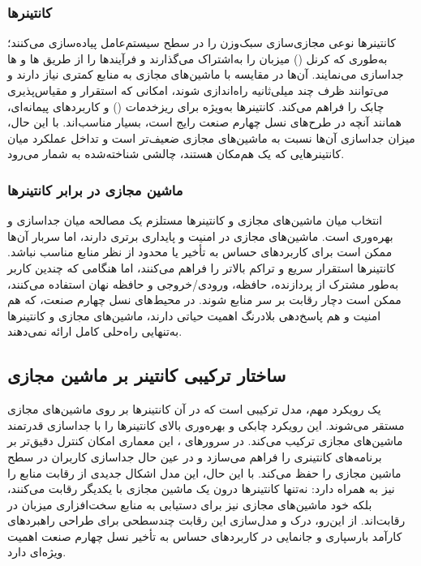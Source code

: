 \subsubsection{کانتینر‌ها}

کانتینرها نوعی مجازی‌سازی سبک‌وزن را در سطح سیستم‌عامل پیاده‌سازی می‌کنند؛ به‌طوری که کرنل () میزبان را به‌اشتراک می‌گذارند و فرآیندها را از طریق ها و ها جداسازی می‌نمایند. آن‌ها در مقایسه با ماشین‌های مجازی به منابع کمتری نیاز دارند و می‌توانند ظرف چند میلی‌ثانیه راه‌اندازی شوند، امکانی که استقرار و مقیاس‌پذیری چابک را فراهم می‌کند. کانتینرها به‌ویژه برای ریزخدمات () و کاربردهای پیمانه‌ای، همانند آنچه در طرح‌های نسل چهارم صنعت رایج است، بسیار مناسب‌اند. با این حال، میزان جداسازی آن‌ها نسبت به ماشین‌های مجازی ضعیف‌تر است و تداخل عملکرد میان کانتینرهایی که یک هم‌مکان هستند، چالشی شناخته‌شده به شمار می‌رود.

\subsubsection{ماشین مجازی در برابر کانتینر‌ها}

انتخاب میان ماشین‌های مجازی و کانتینرها مستلزم یک مصالحه میان جداسازی و بهره‌وری است. ماشین‌های مجازی در امنیت و پایداری برتری دارند، اما سربار آن‌ها ممکن است برای کاربردهای حساس به تأخیر یا محدود از نظر منابع مناسب نباشد. کانتینرها استقرار سریع و تراکم بالاتر را فراهم می‌کنند، اما هنگامی که چندین کاربر به‌طور مشترک از پردازنده، حافظه، ورودی/خروجی و حافظه نهان استفاده می‌کنند، ممکن است دچار رقابت بر سر منابع شوند. در محیط‌های نسل چهارم صنعت، که هم امنیت و هم پاسخ‌دهی بلادرنگ اهمیت حیاتی دارند، ماشین‌های مجازی و کانتینرها به‌تنهایی راه‌حلی کامل ارائه نمی‌دهند.

\subsection{ساختار ترکیبی کانتینر بر ماشین مجازی}

یک رویکرد مهم، مدل ترکیبی است که در آن کانتینرها بر روی ماشین‌های مجازی مستقر می‌شوند. این رویکرد چابکی و بهره‌وری بالای کانتینرها را با جداسازی قدرتمند ماشین‌های مجازی ترکیب می‌کند. در سرورهای ، این معماری امکان کنترل دقیق‌تر بر برنامه‌های کانتینری را فراهم می‌سازد و در عین حال جداسازی کاربران در سطح ماشین مجازی را حفظ می‌کند. با این حال، این مدل اشکال جدیدی از رقابت منابع را نیز به همراه دارد: نه‌تنها کانتینرها درون یک ماشین مجازی با یکدیگر رقابت می‌کنند، بلکه خود ماشین‌های مجازی نیز برای دستیابی به منابع سخت‌افزاری میزبان  در رقابت‌اند. از این‌رو، درک و مدل‌سازی این رقابت چندسطحی برای طراحی راهبردهای کارآمد بارسپاری و جانمایی در کاربردهای حساس به تأخیر نسل چهارم صنعت اهمیت ویژه‌ای دارد.

